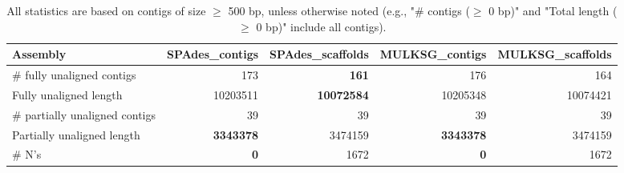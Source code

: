 \documentclass[12pt,a4paper]{article}
\begin{document}
\begin{table}[ht]
\begin{center}
\caption{All statistics are based on contigs of size $\geq$ 500 bp, unless otherwise noted (e.g., "\# contigs ($\geq$ 0 bp)" and "Total length ($\geq$ 0 bp)" include all contigs).}
\begin{tabular}{|l*{4}{|r}|}
\hline
Assembly & SPAdes\_contigs & SPAdes\_scaffolds & MULKSG\_contigs & MULKSG\_scaffolds \\ \hline
\# fully unaligned contigs & 173 & {\bf 161} & 176 & 164 \\ \hline
Fully unaligned length & 10203511 & {\bf 10072584} & 10205348 & 10074421 \\ \hline
\# partially unaligned contigs & 39 & 39 & 39 & 39 \\ \hline
Partially unaligned length & {\bf 3343378} & 3474159 & {\bf 3343378} & 3474159 \\ \hline
\# N's & {\bf 0} & 1672 & {\bf 0} & 1672 \\ \hline
\end{tabular}
\end{center}
\end{table}
\end{document}
